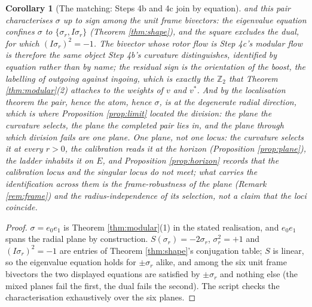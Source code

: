 \documentclass[11pt]{article}
\newtheorem{corollary}[theorem]{Corollary}
\theoremstyle{definition}
\begin{document}
\begin{corollary}[The matching: Steps 4b and 4c join by equation]
and this pair characterises $\sigma$ up to sign among the unit frame bivectors: the eigenvalue equation confines $\sigma$ to $\{\sigma_r, I\sigma_r\}$ (Theorem \ref{thm:shape}), and the square excludes the dual, for which $(I\sigma_r)^2 = -1$. The bivector whose rotor flow is Step 4c's modular flow is therefore the same object Step 4b's curvature distinguishes, identified by equation rather than by name; the residual sign is the orientation of the boost, the labelling of outgoing against ingoing, which is exactly the $\mathbb{Z}_2$ that Theorem \ref{thm:modular}(2) attaches to the weights of $v$ and $v^*$. And by the localisation theorem \cite[Thm.~4.4, Cor.~4.5]{ButlerT4} the pair, hence the atom, hence $\sigma$, is at the degenerate radial direction, which is where Proposition \ref{prop:limit} located the division: the plane the curvature selects, the plane the completed pair lies in, and the plane through which division fails are one plane. One plane, not one locus: the curvature selects it at every $r > 0$, the calibration reads it at the horizon (Proposition \ref{prop:plane}), the ladder inhabits it on $E$, and Proposition \ref{prop:horizon} records that the calibration locus and the singular locus do not meet; what carries the identification across them is the frame-robustness of the plane (Remark \ref{rem:frame}) and the radius-independence of its selection, not a claim that the loci coincide.
\end{corollary}

\begin{proof}
$\sigma = e_0 e_1$ is Theorem \ref{thm:modular}(1) in the stated realisation, and $e_0 e_1$ spans the radial plane by construction. $S(\sigma_r) = -2\sigma_r$, $\sigma_r^2 = +1$ and $(I\sigma_r)^2 = -1$ are entries of Theorem \ref{thm:shape}'s conjugation table; $S$ is linear, so the eigenvalue equation holds for $\pm\sigma_r$ alike, and among the six unit frame bivectors the two displayed equations are satisfied by $\pm\sigma_r$ and nothing else (the mixed planes fail the first, the dual fails the second). The script checks the characterisation exhaustively over the six planes.
\end{proof}
\end{document}
